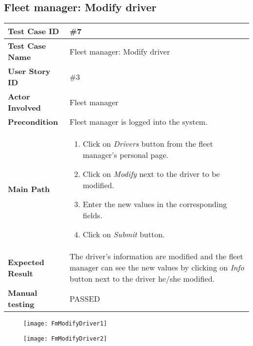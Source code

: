 \subsection{Fleet manager: Modify driver}
\begin{center}
	\begin{tabular} { | m{3.5cm} | m{9.5cm} | }
		\hline
		\textbf{Test Case ID} & \#7\\
		\hline
		\textbf{Test Case Name} & Fleet manager: Modify driver\\
		\hline
		\textbf{User Story ID} & \#3 \\
		\hline
		\textbf{Actor Involved} & Fleet manager\\
		\hline
		\textbf{Precondition} & Fleet manager is logged into the system.\\
		\hline
		\textbf{Main Path} & 
		\begin{enumerate}
			\item Click on \textit{Drivers} button from the fleet manager's personal page.
			\item Click on \textit{Modify} next to the driver to be modified.
			\item Enter the new values in the corresponding fields.
			\item Click on \textit{Submit} button.
		\end{enumerate}\\
		\hline
		\textbf{Expected Result} & The driver's information are modified and the fleet manager can see the new values by clicking on \textit{Info} button next to the driver he/she modified.\\
		\hline
	\textbf{Manual testing} & PASSED\\
	\hline
\end{tabular}
\end{center}
\begin{figure}[H]
\centering
\texttt{[image: FmModifyDriver1]}
\end{figure}

\begin{figure}[H]
\centering
\texttt{[image: FmModifyDriver2]}
\end{figure}
\newpage
